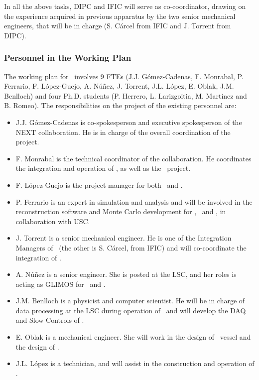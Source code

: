 
In all the above tasks, DIPC and IFIC will serve as co-coordinator, drawing on the experience acquired in previous apparatus by the two senior mechanical engineers, that will be in charge (S. C\'arcel from IFIC and J. Torrent from DIPC). 

\subsubsection*{Personnel in the Working Plan}
The working plan for \sDIPC\ involves 9 FTEs (J.J. G\'omez-Cadenas, F. Monrabal, P. Ferrario, F. L\'opez-Guejo, A. N\'u\~nez, J. Torrent, J.L. L\'opez, E. Oblak, J.M. Benlloch) and four Ph.D. students (P. Herrero, L. Larizgoitia, M. Mart\'inez and B. Romeo). The responsibilities on the project of the existing personnel are:


\begin{itemize}[noitemsep,topsep=0pt,parsep=0pt,partopsep=0pt]
\item J.J. G\'omez-Cadenas is co-spokesperson and executive spokesperson of the NEXT collaboration. He is in charge of the overall coordination of the project. 
\item F. Monrabal is the technical coordinator of the collaboration. He coordinates the integration and operation of \Next, as well as the \HDEMO\ project.
\item  F. L\'opez-Guejo is the project manager  for both \Next\ and \NHD.
\item P. Ferrario is an expert in simulation and analysis and will be involved in the reconstruction software and Monte Carlo development for \Next, \HDEMO\ and \NHD, in collaboration with USC. 
\item J. Torrent is a senior mechanical engineer. He is one of the Integration Managers of \Next\ (the other is S. C\'arcel, from IFIC) and will co-coordinate the integration of \NHD. 
\item A. N\'u\~nez is a senior engineer. She is posted at the LSC, and her roles is acting as GLIMOS  for \Next\ and \NHD. 
\item J.M. Benlloch is a  physicist and computer scientist. He will be in charge of data processing at the LSC  during operation of \Next\ and will develop the DAQ and Slow Controls of \HDEMO.
\item E. Oblak is a  mechanical engineer. She  will work in the design of \NHD\ vessel and the design of \HDEMO.  
\item J.L. L\'opez is a technician, and will assist in the construction and operation of \HDEMO. 
\end{itemize}

